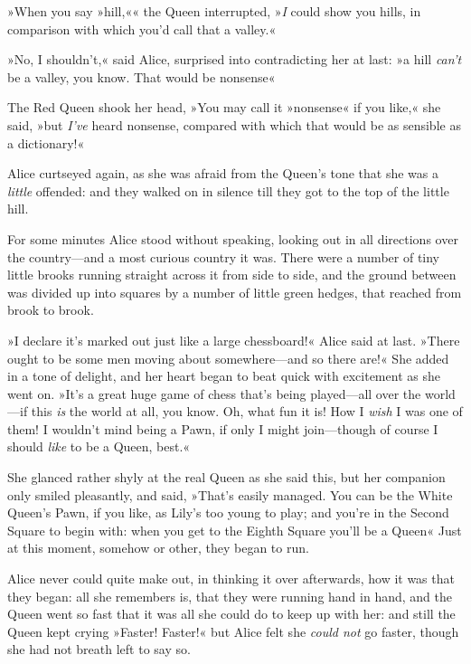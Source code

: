»When you say »hill,«« the Queen interrupted, »\textit{I} could show you hills, in comparison with which you'd call that a valley.«

»No, I shouldn't,« said Alice, surprised into contradicting her at last: »a hill \textit{can't} be a valley, you know. That would be nonsense\longdash«

The Red Queen shook her head, »You may call it »nonsense« if you like,« she said, »but \textit{I've} heard nonsense, compared with which that would be as sensible as a dictionary!«

Alice curtseyed again, as she was afraid from the Queen's tone that she was a \textit{little} offended: and they walked on in silence till they got to the top of the little hill.

For some minutes Alice stood without speaking, looking out in all directions over the country—and a most curious country it was. There were a number of tiny little brooks running straight across it from side to side, and the ground between was divided up into squares by a number of little green hedges, that reached from brook to brook.

»I declare it's marked out just like a large chessboard!« Alice said at last. »There ought to be some men moving about somewhere—and so there are!« She added in a tone of delight, and her heart began to beat quick with excitement as she went on. »It's a great huge game of chess that's being played—all over the world—if this \textit{is} the world at all, you know. Oh, what fun it is! How I \textit{wish} I was one of them! I wouldn't mind being a Pawn, if only I might join—though of course I should \textit{like} to be a Queen, best.«

She glanced rather shyly at the real Queen as she said this, but her companion only smiled pleasantly, and said, »That's easily managed. You can be the White Queen's Pawn, if you like, as Lily's too young to play; and you're in the Second Square to begin with: when you get to the Eighth Square you'll be a Queen\longdash« Just at this moment, somehow or other, they began to run.

Alice never could quite make out, in thinking it over afterwards, how it was that they began: all she remembers is, that they were running hand in hand, and the Queen went so fast that it was all she could do to keep up with her: and still the Queen kept crying »Faster! Faster!« but Alice felt she \textit{could not} go faster, though she had not breath left to say so.

